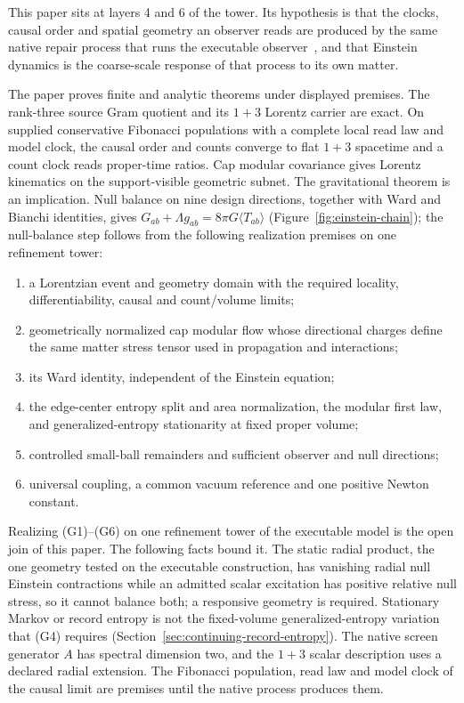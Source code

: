 \documentclass[11pt]{article}
\begin{document}
This paper sits at layers 4 and 6 of the tower. Its hypothesis is that the
clocks, causal order and spatial geometry an observer reads are produced by the
same native repair process that runs the executable observer~\cite{ophmodel},
and that Einstein dynamics is the coarse-scale response of that process to its
own matter.

The paper proves finite and analytic theorems under displayed premises. The
rank-three source Gram quotient and its $1+3$ Lorentz carrier are exact. On
supplied conservative Fibonacci populations with a complete local read law and
model clock, the causal order and counts converge to flat $1+3$ spacetime and a
count clock reads proper-time ratios. Cap modular covariance gives Lorentz
kinematics on the support-visible geometric subnet. The gravitational theorem
is an implication. Null balance on nine design directions, together with Ward
and Bianchi identities, gives $G_{ab}+\Lambda g_{ab}=8\pi G\langle T_{ab}\rangle$
(Figure~\ref{fig:einstein-chain}); the null-balance step follows from the
following realization premises on one refinement tower:
\begin{enumerate}\setlength{\itemsep}{1pt}
\item[(G1)] a Lorentzian event and geometry domain with the required
  locality, differentiability, causal and count/volume limits;
\item[(G2)] geometrically normalized cap modular flow whose directional charges
  define the same matter stress tensor used in propagation and interactions;
\item[(G3)] its Ward identity, independent of the Einstein equation;
\item[(G4)] the edge-center entropy split and area normalization, the modular
  first law, and generalized-entropy stationarity at fixed proper volume;
\item[(G5)] controlled small-ball remainders and sufficient observer and null
  directions;
\item[(G6)] universal coupling, a common vacuum reference and one positive
  Newton constant.
\end{enumerate}

Realizing (G1)--(G6) on one refinement tower of the executable model is the
open join of this paper. The following facts bound it. The static radial product, the
one geometry tested on the executable construction, has vanishing radial null
Einstein contractions while an admitted scalar excitation has positive relative
null stress, so it cannot balance both; a responsive geometry is required.
Stationary Markov or record entropy is not the fixed-volume
generalized-entropy variation that (G4) requires
(Section~\ref{sec:continuing-record-entropy}). The native screen generator $A$
has spectral dimension two, and the $1+3$ scalar description uses a declared
radial extension. The Fibonacci population, read law and model clock of the
causal limit are premises until the native process produces them.
\end{document}
